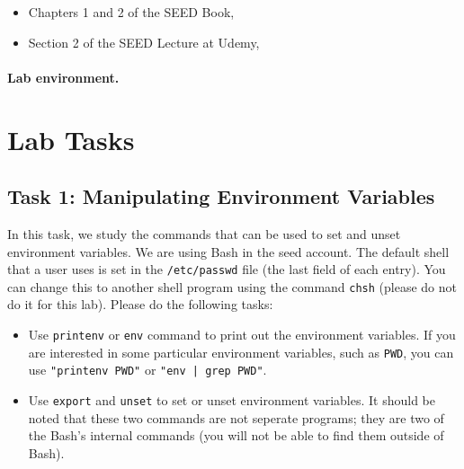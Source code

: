 \begin{itemize}
\item Chapters 1 and 2 of the SEED Book, \seedbook
\item Section 2 of the SEED Lecture at Udemy, \seedcsvideo
\end{itemize}

\paragraph{Lab environment.} \seedenvironment





\section{Lab Tasks}



\subsection{Task 1: Manipulating Environment Variables}

In this task, we study the commands that can be used to set and unset
environment variables. We are using Bash in the seed account. The default
shell that a user uses is set in  the {\tt /etc/passwd} file (the last
field of each entry). You can change this to another shell program using
the command {\tt chsh} (please do not do it for this lab). Please 
do the following tasks:

\begin{itemize}
\item Use {\tt printenv} or {\tt env} command to print out the 
environment variables. If you are interested in some particular 
environment variables, such as {\tt PWD}, you can use {\tt "printenv PWD"}
or {\tt "env | grep PWD"}. 


\item Use {\tt export} and {\tt unset} to set or unset environment
variables. It should be noted that 
these two commands are not seperate programs; they are two of 
the Bash's internal commands (you will not be able to find them
outside of Bash).

\end{itemize}





